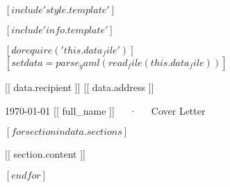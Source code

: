 $[ include 'style.template' ]$

$[ include 'info.template' ]$

$[ do require('this.data_file') ]$
$[ set data = parse_yaml(read_file(this.data_file)) ]$

\recipient
  {[[ data.recipient ]]}
  {[[ data.address ]]}



\makecvheader[R]

\makecvfooter
  {\today}
  {[[ full_name ]]~~~·~~~Cover Letter}
  {}

\makelettertitle

\begin{cvletter}

$[ for section in data.sections ]$

[[ section.content ]]

$[ endfor ]$

\end{cvletter}


\makeletterclosing


